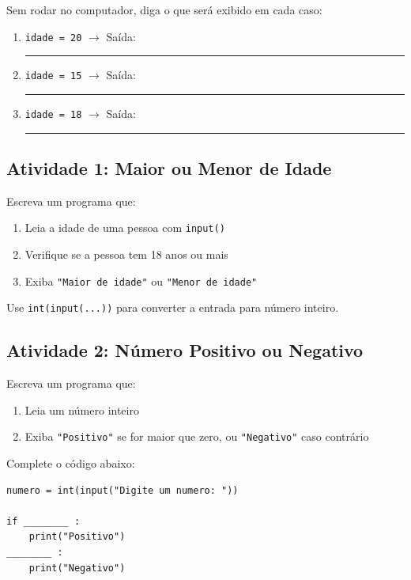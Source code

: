 \documentclass[12pt]{article}
\begin{document}
\begin{fixacaobox}
Sem rodar no computador, diga o que será exibido em cada caso:
\begin{enumerate}
    \item \texttt{idade = 20} $\rightarrow$ Saída: \rule{5cm}{0.4pt}
    \item \texttt{idade = 15} $\rightarrow$ Saída: \rule{5cm}{0.4pt}
    \item \texttt{idade = 18} $\rightarrow$ Saída: \rule{5cm}{0.4pt}
\end{enumerate}
\end{fixacaobox}

\subsection*{Atividade 1: Maior ou Menor de Idade}
Escreva um programa que:
\begin{enumerate}
    \item Leia a idade de uma pessoa com \texttt{input()}
    \item Verifique se a pessoa tem 18 anos ou mais
    \item Exiba \texttt{"Maior de idade"} ou \texttt{"Menor de idade"}
\end{enumerate}

\begin{dicabox}
Use \texttt{int(input(...))} para converter a entrada para número inteiro.
\end{dicabox}

\subsection*{Atividade 2: Número Positivo ou Negativo}
Escreva um programa que:
\begin{enumerate}
    \item Leia um número inteiro
    \item Exiba \texttt{"Positivo"} se for maior que zero, ou \texttt{"Negativo"} caso contrário
\end{enumerate}

\begin{fixacaobox}
Complete o código abaixo:
\begin{lstlisting}
numero = int(input("Digite um numero: "))

if ________ :
    print("Positivo")
________ :
    print("Negativo")
\end{lstlisting}
\end{fixacaobox}
\end{document}
